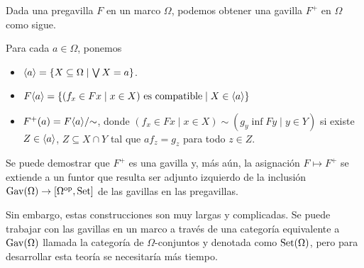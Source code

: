 Dada una pregavilla $F$ en un marco $\Omega$,
podemos obtener una gavilla $F^+$ en $\Omega$ como sigue.

Para cada $a\in\Omega$, ponemos
\begin{itemize}
    \item
    $\langle a\rangle = \{X\subseteq\Omega\mid\bigvee X=a\}$.
    \item
    $F\langle a\rangle
    = \{(f_x\in Fx\mid x\in X)\text{ es compatible}\mid X\in\langle a\rangle\}$
    \item
    $F^+(a)=F\langle a\rangle/{\sim}$,
    donde $(f_x\in Fx\mid x\in X)\sim(g_y\inf Fy\mid y\in Y)$
    si existe $Z\in\langle a\rangle$, $Z\subseteq X\cap Y$ tal que
    $af_z=g_z$ para todo $z\in Z$.
\end{itemize}
Se puede demostrar que $F^+$ es una gavilla y, más aún,
la asignación $F\mapsto F^+$ se extiende a un funtor
que resulta ser adjunto izquierdo
de la inclusión $\operatorname{Gav}(\Omega)\to[\Omega^{\mathrm{op}},\mathrm{Set}]$
de las gavillas en las pregavillas.

Sin embargo, estas construcciones son muy largas y complicadas.
Se puede trabajar con las gavillas en un marco a través
de una categoría equivalente a $\operatorname{Gav}(\Omega)$ llamada la categoría
de $\Omega$-conjuntos y denotada como $\mathrm{Set}(\Omega)$,
pero para desarrollar esta teoría se necesitaría más tiempo.

